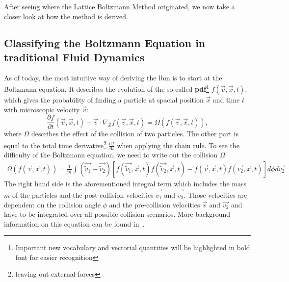 After seeing where the Lattice Boltzmann Method originated, we now take a closer look at how the method is derived.

\subsection{Classifying the Boltzmann Equation in traditional Fluid Dynamics}
\label{sub:Classifying the Boltzmann Equation in traditional Fluid Dynamics}

As of today, the most intuitive way of deriving the \gls{lbm} is to start at the Boltzmann equation.
It describes the evolution of the so-called \textbf{\gls{pdf}}\footnote{Important new vocabulary and vectorial quantities will be highlighted in bold font for easier recognition} $f(\vec{v},\vec{x},t)$, which gives the probability of finding a particle at spacial position $\vec{x}$ and time $t$ with microscopic velocity $\vec{v}$:
\begin{equation}
  \label{eq: Boltzmann transport equation}
  \frac{\partial f}{\partial t} (\vec{v},\vec{x},t) + \vec{v} \cdot \nabla_{\vec{x}} f(\vec{v},\vec{x},t) = \Omega\left(f(\vec{v},\vec{x},t)\right),
\end{equation}
where $\Omega$ describes the effect of the collision of two particles. The other part is equal to the total time derivative\footnote{leaving out external forces} $\frac{\text{d}f}{\text{d}t}$ when applying the chain rule.
To see the difficulty of the Boltzmann equation, we need to write out the collision $\Omega$:
\begin{equation}
  \label{eq: Collision of boltzmann equation}
  \begin{aligned}
 \Omega\left(f(\vec{v},\vec{x},t)\right) =\frac{1}{m}
  \int \left( \vec{\tilde{v}_1}-\vec{\tilde{v}_2}\right)
  \left[
    f(\vec{\tilde{v}_1},\vec{x},t)f(\vec{\tilde{v}_2},\vec{x},t)
    -f(\vec{v},\vec{x},t)f(\vec{v_2},\vec{x},t)
  \right] d\phi d\vec{v_2}
\end{aligned}
\end{equation}
The right hand side is the aforementioned integral term which includes the mass $m$ of the particles and the post-collision velocities $\vec{\tilde{v}_1}$ and $\vec{\tilde{v}_2}$.
Those velocities are dependent on the collision angle $\phi$ and the pre-collision velocities $\vec{v}$ and $\vec{v_2}$ and have to be integrated over all possible collision scenarios.
More background information on this equation can be found in~\cite{harris2004introduction}.

